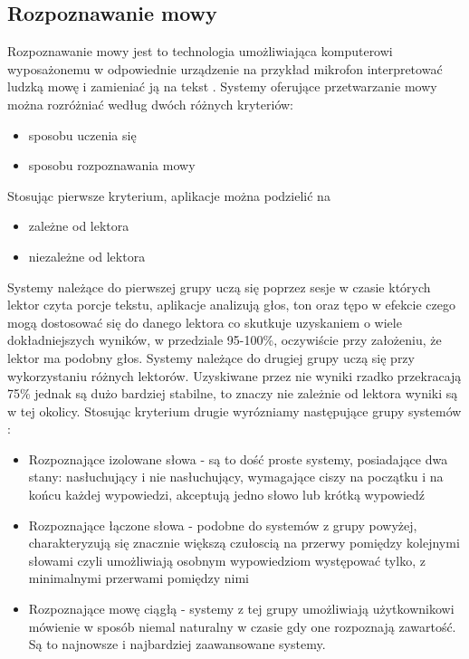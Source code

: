 \subsection{Rozpoznawanie mowy}
Rozpoznawanie mowy jest to technologia umożliwiająca komputerowi wyposażonemu w odpowiednie urządzenie na przykład mikrofon interpretować ludzką mowę i zamieniać ją na tekst \cite{douglas2002}. Systemy oferujące przetwarzanie mowy można rozróżniać	 według dwóch różnych kryteriów:
\begin{itemize}
	\item sposobu uczenia się
	\item sposobu rozpoznawania mowy
\end{itemize}
Stosując pierwsze kryterium, aplikacje można podzielić na
\begin{itemize}
	\item zależne od lektora
	\item niezależne od lektora
\end{itemize}
Systemy należące do pierwszej grupy uczą się poprzez sesje w czasie których lektor czyta porcje tekstu, aplikacje analizują głos, ton oraz tępo  w efekcie czego mogą dostosować się do danego lektora co skutkuje uzyskaniem o wiele dokładniejszych wyników, w przedziale 95-100\%, oczywiście przy założeniu, że lektor ma podobny głos.  Systemy należące do drugiej grupy uczą się przy wykorzystaniu różnych lektorów. Uzyskiwane przez nie wyniki rzadko przekracają 75\% jednak są dużo bardziej stabilne, to znaczy nie zależnie od lektora wyniki są w tej okolicy. 
Stosując kryterium drugie wyrózniamy następujące grupy systemów \cite{gaikwad2010} :
\begin{itemize}
	\item Rozpoznające izolowane słowa - są to dość proste systemy, posiadające dwa stany: nasłuchujący i nie nasłuchujący,  wymagające ciszy na początku i na końcu każdej wypowiedzi,  akceptują jedno słowo lub krótką wypowiedź 
	\item Rozpoznające łączone słowa - podobne do systemów z grupy powyżej, charakteryzują się znacznie większą czułoscią na przerwy pomiędzy kolejnymi słowami czyli umożliwiają osobnym wypowiedziom występować tylko, z minimalnymi przerwami pomiędzy nimi
	\item Rozpoznające mowę ciągłą -  systemy z tej grupy umożliwiają użytkownikowi mówienie w sposób niemal naturalny w czasie gdy one rozpoznają zawartość. Są to najnowsze i najbardziej zaawansowane systemy.
\end{itemize}
